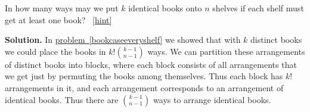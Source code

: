 \documentclass{book}
\begin{document}
\setcounter{project}{127}
\addtocounter{project}{-1}
\begin{activity}[]\label{activity-120}
\hypertarget{p-911}{}%
In how many ways may we put \(k\) identical books onto \(n\) shelves if each shelf must get at least one book?%
~\hfill{\tiny\hyperlink{a-127}{[hint]}\hypertarget{q-127}{}}\par\smallskip%
\noindent\textbf{Solution.}\hypertarget{solution-101}{}\quad%
\hypertarget{p-913}{}%
In \hyperref[bookcaseeveryshelf]{problem~\ref{bookcaseeveryshelf}} we showed that with \(k\) distinct books we could place the books in \(k!\binom{k-1}{n-1}\) ways. We can partition these arrangements of distinct books into blocks, where each block consists of all arrangements that we get just by permuting the books among themselves. Thus each block has \(k!\) arrangements in it, and each arrangement corresponds to an arrangement of identical books. Thus there are \(\binom{k-1}{n-1}\) ways to arrange identical books.%
\end{activity}
\end{document}
